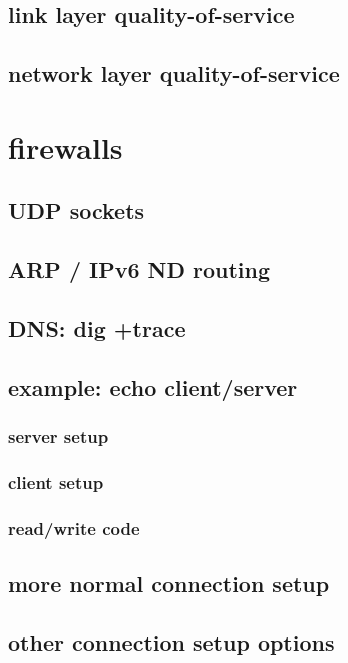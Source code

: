 \subsection{link layer quality-of-service}


\subsection{network layer quality-of-service}


\section{firewalls} %


\subsection{UDP sockets}


\subsection{ARP / IPv6 ND routing}


\subsection{DNS: dig +trace}



\subsection{example: echo client/server}
\subsubsection{server setup}

\subsubsection{client setup}


\subsubsection{read/write code}



\subsection{more normal connection setup}



\subsection{other connection setup options}




